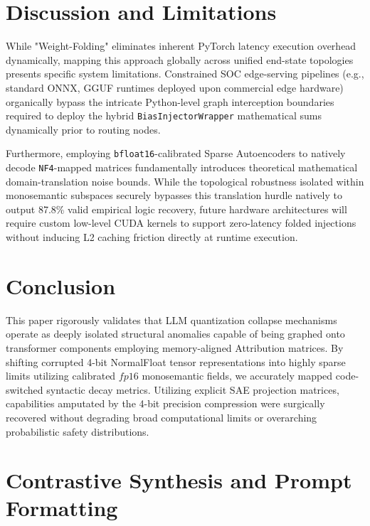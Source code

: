 \documentclass{article}
\begin{document}
\section{Discussion and Limitations}

While "Weight-Folding" eliminates inherent PyTorch latency execution overhead dynamically, mapping this approach globally across unified end-state topologies presents specific system limitations. Constrained SOC edge-serving pipelines (e.g., standard ONNX, GGUF runtimes deployed upon commercial edge hardware) organically bypass the intricate Python-level graph interception boundaries required to deploy the hybrid \texttt{BiasInjectorWrapper} mathematical sums dynamically prior to routing nodes. 

Furthermore, employing \texttt{bfloat16}-calibrated Sparse Autoencoders to natively decode \texttt{NF4}-mapped matrices fundamentally introduces theoretical mathematical domain-translation noise bounds. While the topological robustness isolated within monosemantic subspaces securely bypasses this translation hurdle natively to output 87.8\% valid empirical logic recovery, future hardware architectures will require custom low-level CUDA kernels to support zero-latency folded injections without inducing L2 caching friction directly at runtime execution.

\section{Conclusion}

This paper rigorously validates that LLM quantization collapse mechanisms operate as deeply isolated structural anomalies capable of being graphed onto transformer components employing memory-aligned Attribution matrices. By shifting corrupted 4-bit NormalFloat tensor representations into highly sparse limits utilizing calibrated $fp16$ monosemantic fields, we accurately mapped code-switched syntactic decay metrics. Utilizing explicit SAE projection matrices, capabilities amputated by the 4-bit precision compression were surgically recovered without degrading broad computational limits or overarching probabilistic safety distributions. 




\clearpage
\appendix

\section{Contrastive Synthesis and Prompt Formatting}
\label{appendix:prompts}
\end{document}

